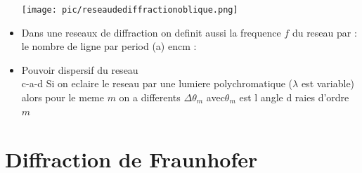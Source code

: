 \documentclass[12pt]{book}
\begin{document}
\begin{itemize}
\begin{minipage}{0.49\linewidth}
                \end{minipage}
                \begin{minipage}{0.49\linewidth}
                    \texttt{[image: pic/reseaudediffractionoblique.png]}
                \end{minipage}
                \item Dans une reseaux de diffraction on definit aussi la frequence $f$ du reseau par : le nombre de ligne par period (a) encm  :  
                \item Pouvoir dispersif du reseau  \\ c-a-d Si on eclaire le reseau par une lumiere polychromatique ($\lambda $ est variable) alors pour le meme $m$ on a differents $\Delta\theta_m$ avec$\theta_m$ est l angle d raies d'ordre $m$ 
            \end{itemize}
        \section{Diffraction de Fraunhofer}      
\end{document}
